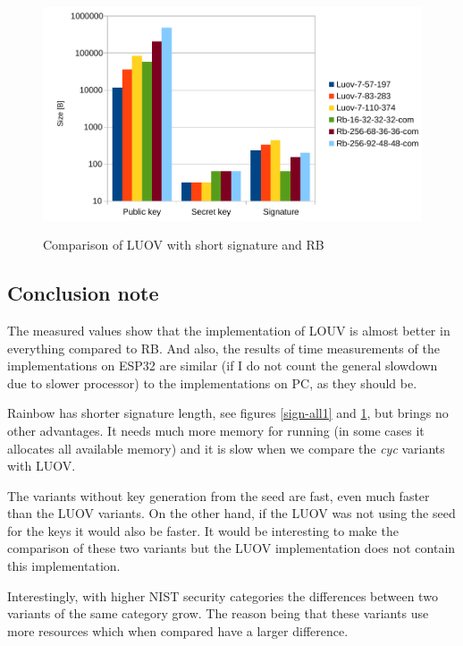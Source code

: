 \documentclass[thesis=M,english]{FITthesis}[2019/12/23]
\begin{document}
\bigskip\bigskip\bigskip
\begin{figure}[H]
\centering
\includegraphics[width=13cm,height=7cm]{images/mem-sign-all2.pdf}
\caption{Comparison of LUOV with short signature and RB}
\label{sign-all2}
\end{figure}

\newpage
\subsection{Conclusion note}
The measured values show that the implementation of LOUV is almost better in everything compared to RB. And also, the results of time measurements of the implementations on ESP32 are similar (if I do not count the general slowdown due to slower processor) to the implementations on PC, as they should be.

\bigskip
\noindent
Rainbow has shorter signature length, see figures \ref{sign-all1} and \ref{sign-all2}, but brings no other advantages. It needs much more memory for running (in some cases it allocates all available memory) and it is slow when we compare the \textit{cyc} variants with LUOV. 

\bigskip
\noindent
The variants without key generation from the seed are fast, even much faster than the LUOV variants. On the other hand, if the LUOV was not using the seed for the keys it would also be faster. It would be interesting to make the comparison of these two variants but the LUOV implementation does not contain this implementation.

\bigskip
\noindent
Interestingly, with higher NIST security categories the differences between two variants of the same category grow. The reason being that these variants use more resources which when compared have a larger difference. 

\newpage
\end{document}
